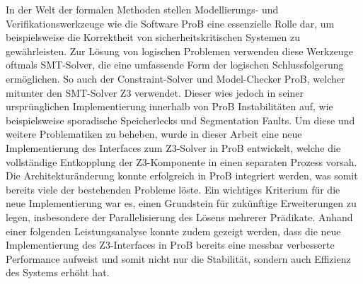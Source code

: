
In der Welt der formalen Methoden stellen Modellierungs- und Verifikationswerkzeuge wie die Software ProB eine essenzielle Rolle dar,
um beispielsweise die Korrektheit von sicherheitskritischen Systemen zu gewährleisten.
Zur Lösung von logischen Problemen verwenden diese Werkzeuge oftmals SMT-Solver, die eine umfassende Form der logischen Schlussfolgerung ermöglichen.
So auch der Constraint-Solver und Model-Checker ProB, welcher mitunter den SMT-Solver Z3 verwendet.
Dieser wies jedoch in seiner ursprünglichen Implementierung innerhalb von ProB Instabilitäten auf, wie beispielsweise sporadische Speicherlecks und Segmentation Faults.
Um diese und weitere Problematiken zu beheben, wurde in dieser Arbeit eine neue Implementierung des Interfaces zum Z3-Solver in ProB entwickelt, welche
die vollständige Entkopplung der Z3-Komponente in einen separaten Prozess vorsah.
Die Architekturänderung konnte erfolgreich in ProB integriert werden, was somit bereits viele der bestehenden Probleme löste.
Ein wichtiges Kriterium für die neue Implementierung war es, einen Grundstein für zukünftige Erweiterungen zu legen, insbesondere der Parallelisierung des Lösens mehrerer Prädikate.
Anhand einer folgenden Leistungsanalyse konnte zudem gezeigt werden, dass die neue Implementierung des Z3-Interfaces
in ProB bereits eine messbar verbesserte Performance aufweist und somit nicht nur die Stabilität, sondern auch Effizienz des Systems erhöht hat.
